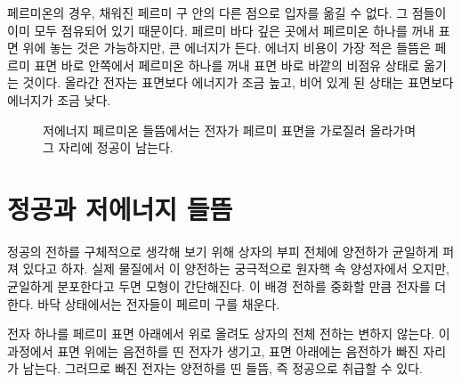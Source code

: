 페르미온의 경우, 채워진 페르미 구 안의 다른 점으로 입자를 옮길 수 없다. 그 점들이 이미 모두 점유되어 있기 때문이다. 페르미 바다 깊은 곳에서 페르미온 하나를 꺼내 표면 위에 놓는 것은 가능하지만, 큰 에너지가 든다. 에너지 비용이 가장 적은 들뜸은 페르미 표면 바로 안쪽에서 페르미온 하나를 꺼내 표면 바로 바깥의 비점유 상태로 옮기는 것이다. 올라간 전자는 표면보다 에너지가 조금 높고, 비어 있게 된 상태는 표면보다 에너지가 조금 낮다.

\begin{figure}
\centering
{}
\caption{저에너지 페르미온 들뜸에서는 전자가 페르미 표면을 가로질러 올라가며 그 자리에 정공이 남는다.}
\end{figure}

\section{정공과 저에너지 들뜸}

정공의 전하를 구체적으로 생각해 보기 위해 상자의 부피 전체에 양전하가 균일하게 퍼져 있다고 하자. 실제 물질에서 이 양전하는 궁극적으로 원자핵 속 양성자에서 오지만, 균일하게 분포한다고 두면 모형이 간단해진다. 이 배경 전하를 중화할 만큼 전자를 더한다. 바닥 상태에서는 전자들이 페르미 구를 채운다.

전자 하나를 페르미 표면 아래에서 위로 올려도 상자의 전체 전하는 변하지 않는다. 이 과정에서 표면 위에는 음전하를 띤 전자가 생기고, 표면 아래에는 음전하가 빠진 자리가 남는다. 그러므로 빠진 전자는 양전하를 띤 들뜸, 즉 정공으로 취급할 수 있다.

\begin{classroomqa}
\end{classroomqa}

